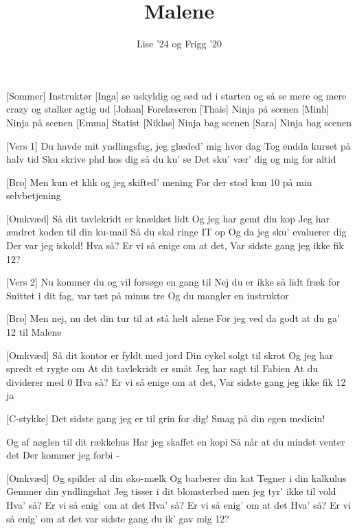 \documentclass[a4paper,11pt]{article}
\title{Malene}
\author{Lise ’24 og Frigg '20}
\begin{document}
\maketitle

\begin{roles}
[Sommer] Instruktør
[Inga] se uskyldig og sød ud i starten og så se mere og mere crazy og stalker agtig ud
[Johan] Forelæseren
[Thais] Ninja på scenen
[Minh] Ninja på scenen
[Emma] Statist
[Niklas] Ninja bag scenen
[Sara] Ninja bag scenen
\end{roles}

\begin{song}
[Vers 1] Du havde mit yndlingsfag, jeg glæded’ mig hver dag
Tog endda kurset på halv tid
Sku skrive phd
hos dig så du ku’ se
Det sku’ vær’ dig og mig for altid


[Bro] Men kun
et klik og jeg skifted’ mening
For der
stod kun 10 på min selvbetjening

[Omkvæd] Så dit tavlekridt er knækket lidt
Og jeg har gemt din kop
Jeg har ændret koden til din ku-mail
Så du skal ringe IT op
Og da jeg sku' evaluerer dig
Der var jeg iskold!
Hva så? Er vi så enige om at det,
Var sidste gang jeg ikke fik 12?

[Vers 2] Nu kommer du og vil forsøge en gang til
Nej du er ikke så lidt fræk for
Snittet i dit fag, var tæt på minus tre
Og du mangler en instruktor

[Bro] Men nej, nu det din tur til at stå helt alene
For jeg ved da godt at du ga’ 12 til Malene

[Omkvæd] Så dit kontor er fyldt med jord
Din cykel solgt til skrot
Og jeg har spredt et rygte om
At dit tavlekridt er småt
Jeg har sagt til Fabien
At du dividerer med 0
Hva så? Er vi så enige om at det,
Var sidste gang jeg ikke fik 12 ja

[C-stykke] Det sidste gang jeg er til grin for dig!
Smag på din egen medicin!

Og af nøglen til dit rækkehus
Har jeg skaffet en kopi
Så når at du mindst venter det
Der kommer jeg forbi -

[Omkvæd] Og spilder al din øko-mælk
Og barberer din kat
Tegner i din kalkulus
Gemmer din yndlingshat
Jeg tisser i dit blomsterbed
men jeg tyr’ ikke til vold
Hva’ så? Er vi så enig’ om at det
Hva’ så? Er vi så enig’ om at det
Hva’ så? Er vi så enig’ om at det
var sidste gang du ik’ gav mig 12?



\end{song}
\end{document}
